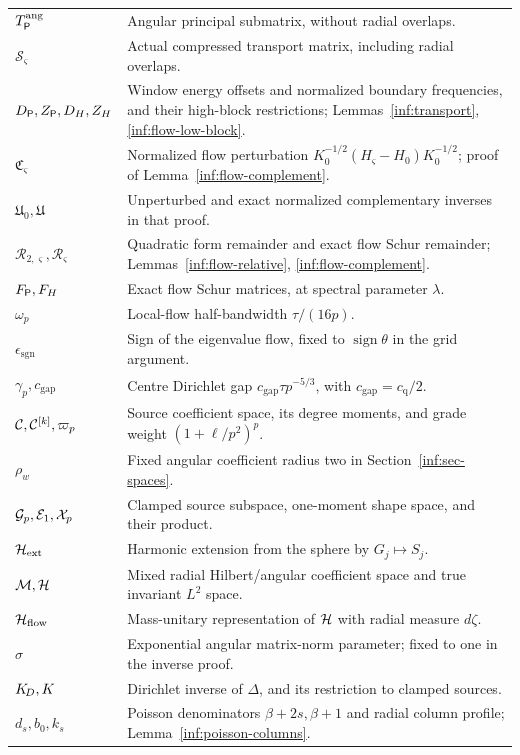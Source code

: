 \begin{longtable}{@{}>{\raggedright\arraybackslash}p{}>{\raggedright\arraybackslash}p{}@{}}
$T_{\mathsf P}^{\mathrm{ang}}$ & Angular principal submatrix, without radial overlaps.\\
$\mathcal S_\varsigma$ & Actual compressed transport matrix, including radial overlaps.\\
$D_\mathsf P,Z_\mathsf P,D_H,Z_H$ & Window energy offsets and normalized boundary frequencies, and their high-block restrictions; Lemmas~\ref{inf:transport}, \ref{inf:flow-low-block}.\\
$\mathfrak C_\varsigma$ & Normalized flow perturbation $K_0^{-1/2}(H_\varsigma-H_0)K_0^{-1/2}$; proof of Lemma~\ref{inf:flow-complement}.\\
$\mathfrak U_0,\mathfrak U$ & Unperturbed and exact normalized complementary inverses in that proof.\\
$\mathcal R_{2,\varsigma},\mathcal R_\varsigma$ & Quadratic form remainder and exact flow Schur remainder; Lemmas~\ref{inf:flow-relative}, \ref{inf:flow-complement}.\\
$F_{\mathsf P},F_H$ & Exact flow Schur matrices, at spectral parameter $\lambda$.\\
$\omega_p$ & Local-flow half-bandwidth $\tau/(16p)$.\\
$\epsilon_{\mathrm{sgn}}$ & Sign of the eigenvalue flow, fixed to $\operatorname{sign}\theta$ in the grid argument.\\
$\gamma_p,c_{\mathrm{gap}}$ & Centre Dirichlet gap $c_{\mathrm{gap}}\tau p^{-5/3}$, with $c_{\mathrm{gap}}=c_{\mathrm q}/2$.\\
$\mathcal C,\mathcal C^{[k]},\varpi_p$ & Source coefficient space, its degree moments, and grade weight $(1+\ell/p^2)^p$.\\
$\rho_w$ & Fixed angular coefficient radius two in Section~\ref{inf:sec-spaces}.\\
$\mathcal{G}_p,\mathcal E_1,\mathcal X_p$ & Clamped source subspace, one-moment shape space, and their product.\\
$\mathcal H_{\mathrm{ext}}$ & Harmonic extension from the sphere by $G_j\mapsto S_j$.\\
$\mathcal M,\mathcal{H}$ & Mixed radial Hilbert/angular coefficient space and true invariant $L^2$ space.\\
$\mathcal{H}_{\mathrm{flow}}$ & Mass-unitary representation of $\mathcal{H}$ with radial measure $d\zeta$.\\
$\sigma$ & Exponential angular matrix-norm parameter; fixed to one in the inverse proof.\\
$K_{\!D},K$ & Dirichlet inverse of $\Delta$, and its restriction to clamped sources.\\
$d_s,b_0,k_s$ & Poisson denominators $\beta+2s,\beta+1$ and radial column profile; Lemma~\ref{inf:poisson-columns}.\\

\end{longtable}
